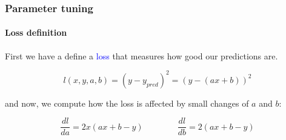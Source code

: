 \documentclass[9pt]{beamer}
\begin{document}
\begin{frame}
  \frametitle{Parameter tuning}

  \framesubtitle{Loss definition}

  First we have a define a \textcolor{blue}{loss} that measures how
  good our predictions are.

  \[
  l(x, y, a, b) = (y - y_{pred})^{2} = (y - (a x + b))^{2}
  \]

  \bigskip

  and now, we compute how the loss is affected by small changes of $a$ and
  $b$:

  \medskip

  \[
  \frac{dl}{da} = 2 x (ax + b - y) \qquad \qquad \frac{dl}{db} = 2 (ax + b - y)
  \]
\end{frame}
\end{document}
